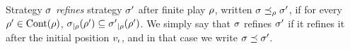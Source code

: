 \begin{definition}
  Strategy $\sigma$ \emph{refines} strategy $\sigma'$  after finite
  play $\rho$, written $\sigma \preceq_{\rho} \sigma'$, if for every  $\rho'\in\text{Cont}(\rho)$,
  ${\sigma}_{|\rho}(\rho')\subseteq {\sigma'}_{|\rho}(\rho')$.
  We simply say that $\sigma$ refines $\sigma'$ if it refines it after
  the initial position $v_{\iota}$, and in that case we write
  $\sigma\preceq \sigma'$.
\end{definition}


